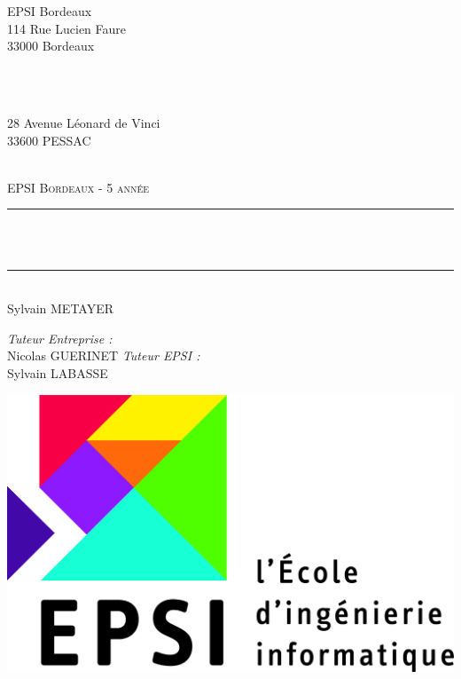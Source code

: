 \begin{titlepage}

\newcommand{\HRule}{\rule{\linewidth}{0.5mm}} %

\centering %
 
\begin{minipage}{0.4\textwidth}
	\begin{flushleft} \large
		EPSI Bordeaux\\
		114 Rue Lucien Faure\\
		33000 Bordeaux
	\end{flushleft}
\end{minipage}
~
\begin{minipage}{0.4\textwidth}
	\begin{flushright} \large
		\onepoint\\
		28 Avenue Léonard de Vinci \\
		33600 PESSAC
	\end{flushright}
\end{minipage}\\[2cm]


\textsc{\LARGE EPSI Bordeaux - 5 année}\\[1.0cm]

\space

\HRule \\[0.4cm]
{ \huge \bfseries 
\problematique
}\\[0.4cm]
\HRule \\[1.5cm]

\LARGE Sylvain \textsc{METAYER}\\[2cm] %

\begin{flushleft} \large
	\emph{Tuteur Entreprise :}\\
	Nicolas \textsc{GUERINET}
	\newline\newline
	\emph{Tuteur EPSI :} \\
	Sylvain \textsc{LABASSE}
\end{flushleft}

\includegraphics[scale=0.05]{img/epsi.jpg}\\[1cm]


\end{titlepage}
